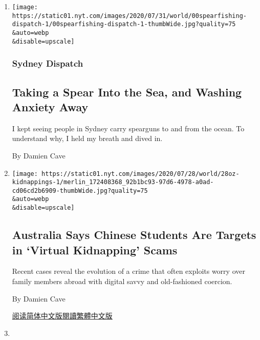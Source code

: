 \begin{enumerate}
\def\labelenumi{\arabic{enumi}.}
\item
  \href{/2020/08/03/world/australia/spearfishing-sydney-coronavirus.html}{}

  \texttt{[image: https://static01.nyt.com/images/2020/07/31/world/00spearfishing-dispatch-1/00spearfishing-dispatch-1-thumbWide.jpg?quality=75\\\&auto=webp\\\&disable=upscale]}

  \hypertarget{sydney-dispatch}{%
  \subsubsection{Sydney Dispatch}\label{sydney-dispatch}}

  \hypertarget{taking-a-spear-into-the-sea-and-washing-anxiety-away}{%
  \subsection{Taking a Spear Into the Sea, and Washing Anxiety
  Away}\label{taking-a-spear-into-the-sea-and-washing-anxiety-away}}

  I kept seeing people in Sydney carry spearguns to and from the ocean.
  To understand why, I held my breath and dived in.

  By Damien Cave
\item
  \href{/2020/07/28/world/australia/chinese-students-virtual-kidnapping.html}{}

  \texttt{[image: https://static01.nyt.com/images/2020/07/28/world/28oz-kidnappings-1/merlin\_172408368\_92b1bc93-97d6-4978-a0ad-cd06cd2b6909-thumbWide.jpg?quality=75\\\&auto=webp\\\&disable=upscale]}

  \hypertarget{australia-says-chinese-students-are-targets-in-virtual-kidnapping-scams}{%
  \subsection{Australia Says Chinese Students Are Targets in `Virtual
  Kidnapping'
  Scams}\label{australia-says-chinese-students-are-targets-in-virtual-kidnapping-scams}}

  Recent cases reveal the evolution of a crime that often exploits worry
  over family members abroad with digital savvy and old-fashioned
  coercion.

  By Damien Cave

  \href{https://cn.nytimes.com/asia-pacific/20200729/chinese-students-virtual-kidnapping/}{阅读简体中文版}\href{https://cn.nytimes.com/asia-pacific/20200729/chinese-students-virtual-kidnapping/zh-hant/}{閱讀繁體中文版}
\item
  \href{/2020/07/24/world/australia/divisions-decency-and-the-plague.html}{}


\end{enumerate}
